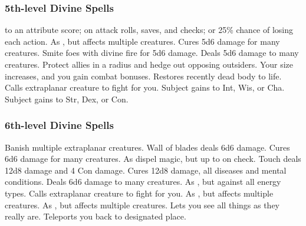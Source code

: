 \subsubsection{5th-level Divine Spells}
\begin{spelllist}
    to an attribute score;  on attack rolls, saves, and checks; or 25\% chance of losing each action.
   As , but affects multiple creatures.
   Cures 5d6 damage for many creatures.
   Smite foes with divine fire for 5d6 damage.
   Deals 5d6 damage to many creatures.
   Protect allies in a \areamed radius and hedge out opposing outsiders.
   Your size increases, and you gain combat bonuses.
   Restores recently dead body to life.
   Calls extraplanar creature to fight for you.
   Subject gains  to Int, Wis, or Cha.
   Subject gains  to Str, Dex, or Con.
\end{spelllist}

\subsubsection{6th-level Divine Spells}
\begin{spelllist}
   Banish multiple extraplanar creatures. 
   Wall of blades deals 6d6 damage.
   Cures 6d6 damage for many creatures.
   As dispel magic, but up to  on check.
   Touch deals 12d8 damage and 4 Con damage.
   Cures 12d8 damage, all diseases and mental conditions.
   Deals 6d6 damage to many creatures.
   As , but against all energy types.
   Calls extraplanar creature to fight for you.
   As , but affects multiple creatures.
   As , but affects multiple creatures.
  \M Lets you see all things as they really are.
   Teleports you back to designated place.
\end{spelllist}


